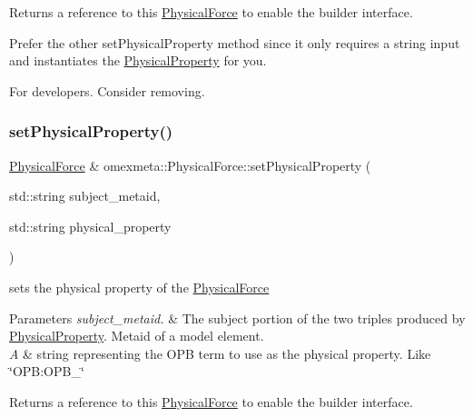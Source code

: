 \begin{DoxyReturn}{Returns}
a reference to this \hyperlink{classomexmeta_1_1PhysicalForce}{Physical\+Force} to enable the builder interface.
\end{DoxyReturn}
Prefer the other set\+Physical\+Property method since it only requires a string input and instantiates the \hyperlink{classomexmeta_1_1PhysicalProperty}{Physical\+Property} for you.

For developers. Consider removing. \mbox{\label{classomexmeta_1_1PhysicalForce_a3f979432322d40efc8a15cf5ee883100}} 
\subsubsection{\texorpdfstring{set\+Physical\+Property()}{setPhysicalProperty()}\hspace{0.1cm}{\footnotesize\ttfamily [2/2]}}
{\footnotesize\ttfamily \hyperlink{classomexmeta_1_1PhysicalForce}{Physical\+Force} \& omexmeta\+::\+Physical\+Force\+::set\+Physical\+Property (\begin{DoxyParamCaption}\item[{std\+::string}]{subject\+\_\+metaid,  }\item[{std\+::string}]{physical\+\_\+property }\end{DoxyParamCaption})}



sets the physical property of the \hyperlink{classomexmeta_1_1PhysicalForce}{Physical\+Force} 


\begin{DoxyParams}{Parameters}
{\em subject\+\_\+metaid.} & The subject portion of the two triples produced by \hyperlink{classomexmeta_1_1PhysicalProperty}{Physical\+Property}. Metaid of a model element. \\
\hline
{\em A} & string representing the O\+PB term to use as the physical property. Like \char`\"{}\+O\+P\+B\+:\+O\+P\+B\+\_\char`\"{} \\
\hline
\end{DoxyParams}
\begin{DoxyReturn}{Returns}
a reference to this \hyperlink{classomexmeta_1_1PhysicalForce}{Physical\+Force} to enable the builder interface. 
\end{DoxyReturn}
\mbox{\label{classomexmeta_1_1PhysicalForce_a39dd511aee85130d07cb6ffb3f8e87f0}} 
